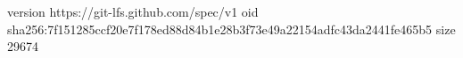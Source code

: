 version https://git-lfs.github.com/spec/v1
oid sha256:7f151285ccf20e7f178ed88d84b1e28b3f73e49a22154adfc43da2441fe465b5
size 29674
